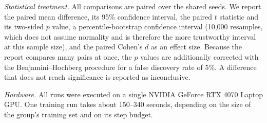 \textit{Statistical treatment.} All comparisons are paired over the shared seeds. We report the paired mean difference, its 95\% confidence interval, the paired $t$ statistic and its two-sided $p$ value, a percentile-bootstrap confidence interval (10{,}000 resamples, which does not assume normality and is therefore the more trustworthy interval at this sample size), and the paired Cohen's $d$ as an effect size. Because the report compares many pairs at once, the $p$ values are additionally corrected with the Benjamini--Hochberg procedure for a false discovery rate of 5\%. A difference that does not reach significance is reported as inconclusive.

\textit{Hardware.} All runs were executed on a single NVIDIA GeForce RTX 4070 Laptop GPU. One training run takes about 150--340 seconds, depending on the size of the group's training set and on its step budget.
